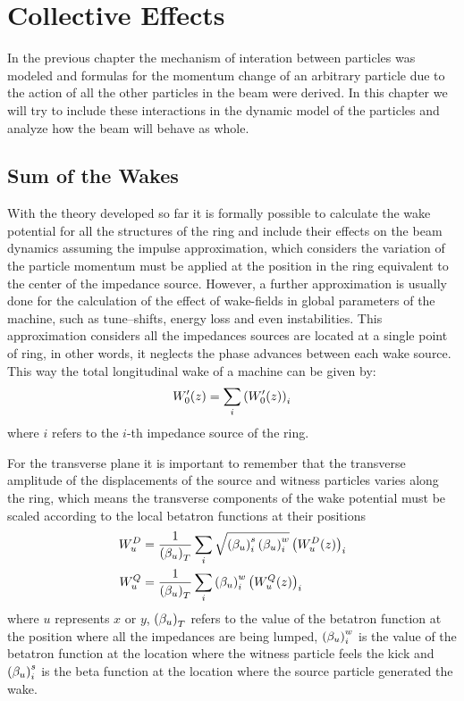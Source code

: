 \chapter{Collective Effects}\label{cap:collective_effects}

    In the previous chapter the mechanism of interation between particles was modeled and formulas for the momentum change of an arbitrary particle due to the action of all the other particles in the beam were derived. In this chapter we will try to include these interactions in the dynamic model of the particles and analyze how the beam will behave as whole.

\section{Sum of the Wakes}\label{sec:sum_of_wakes}

    With the theory developed so far it is formally possible to calculate the wake potential for all the structures of the ring and include their effects on the beam dynamics assuming the impulse approximation, which considers the variation of the particle momentum must be applied at the position in the ring equivalent to the center of the impedance source. However, a further approximation is usually done for the calculation of the effect of wake-fields in global parameters of the machine, such as tune--shifts, energy loss and even instabilities. This approximation considers all the impedances sources are located at a single point of ring, in other words, it neglects the phase advances between each wake source. This way the total longitudinal wake of a machine can be given by:
    \begin{align}\label{eq:scaling_longitudinal}
        W'_0(z) = \sum_i \left(W'_0(z)\right)_i
    \end{align}
    where $i$ refers to the $i$-th impedance source of the ring.

    For the transverse plane it is important to remember that the transverse amplitude of the displacements of the source and witness particles varies along the ring, which means the transverse components of the wake potential must be scaled according to the local betatron functions at their positions
    \begin{align}\label{eq:scaling_transverse_general}\nonumber
        W_u^D &=\frac{1}{\left(\beta_u\right)_T} \sum_i \sqrt{\left(\beta_u\right)_i^s\left(\beta_u\right)_i^w}\left(W_u^D(z)\right)_i \\
        W_u^Q &=\frac{1}{\left(\beta_u\right)_T} \sum_i \left(\beta_u\right)_i^w\left(W_u^Q(z)\right)_i
    \end{align}
    where $u$ represents $x$ or $y$, $\left(\beta_u\right)_T$ refers to the value of the betatron function at the position where all the impedances are being lumped, $\left(\beta_u\right)_i^w$ is the value of the betatron function at the location where the witness particle feels the kick and $\left(\beta_u\right)_i^s$ is the beta function at the location where the source particle generated the wake.


